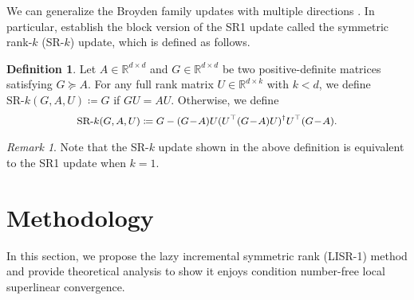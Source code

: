\documentclass[letterpaper]{article} %
\theoremstyle{plain}
\theoremstyle{definition}
\newtheorem{definition}[theorem]{Definition}
\theoremstyle{remark}
\newtheorem{remark}[theorem]{Remark}
\def\BR{{\mathbb{R}}}
\begin{document}

We can generalize the Broyden family updates with multiple directions \cite{gao2018block,liu2023symmetric,gower2016stochastic,gower2017randomized}. 
In particular, \citet{liu2023symmetric} establish the block version of the SR1 update called the symmetric rank-$k$ (SR-$k$) update, which is defined as follows.

\begin{definition}\label{dfn:srk}
Let $A \in \BR^{d \times d}$ and $G \in \BR^{d \times d}$ be two positive-definite matrices satisfying $G \succeq A$. 
For any full rank matrix $U\in\BR^{d\times k}$ with $k < d$, we define $\textrm{SR-}k (G, A, U)  \coloneqq G$ if $G U = A U$. Otherwise, we define
\begin{equation*}
\small\begin{split}
        \textrm{SR-}k (G, A, U)\coloneqq G - (G\!-\!A) U (U^{\top} (G\!-\!A) U)^{\dag} U^{\top} (G\!-\!A).
\end{split}
\end{equation*}

\begin{remark}    
Note that the SR-$k$ update shown in the above definition is equivalent to the SR1 update when $k=1$.
\end{remark}
\end{definition}

\section{Methodology}\label{sec:methodology}

In this section, we propose the lazy incremental symmetric rank (LISR-1) method and provide theoretical analysis to show it enjoys condition number-free local superlinear convergence.

\end{document}
